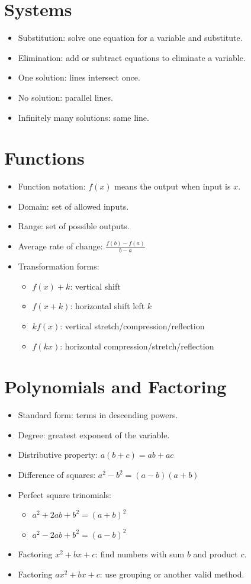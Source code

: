 \documentclass[11pt]{book}
\begin{document}
\section{Systems}

\begin{itemize}
\item Substitution: solve one equation for a variable and substitute.
\item Elimination: add or subtract equations to eliminate a variable.
\item One solution: lines intersect once.
\item No solution: parallel lines.
\item Infinitely many solutions: same line.
\end{itemize}

\section{Functions}

\begin{itemize}
\item Function notation: \(f(x)\) means the output when input is \(x\).
\item Domain: set of allowed inputs.
\item Range: set of possible outputs.
\item Average rate of change: \(\frac{f(b)-f(a)}{b-a}\)
\item Transformation forms:
\begin{itemize}
\item \(f(x)+k\): vertical shift
\item \(f(x+k)\): horizontal shift left \(k\)
\item \(kf(x)\): vertical stretch/compression/reflection
\item \(f(kx)\): horizontal compression/stretch/reflection
\end{itemize}
\end{itemize}

\section{Polynomials and Factoring}

\begin{itemize}
\item Standard form: terms in descending powers.
\item Degree: greatest exponent of the variable.
\item Distributive property: \(a(b+c)=ab+ac\)
\item Difference of squares: \(a^2-b^2=(a-b)(a+b)\)
\item Perfect square trinomials:
\begin{itemize}
\item \(a^2+2ab+b^2=(a+b)^2\)
\item \(a^2-2ab+b^2=(a-b)^2\)
\end{itemize}
\item Factoring \(x^2+bx+c\): find numbers with sum \(b\) and product \(c\).
\item Factoring \(ax^2+bx+c\): use grouping or another valid method.
\end{itemize}
\end{document}
